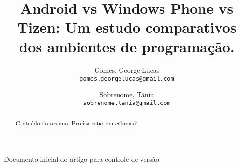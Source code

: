 \documentclass[11pt,a4paper]{article}
\author{
	Gomes, George Lucas\\
	\texttt{gomes.georgelucas@gmail.com}
	\and
	Sobrenome, Tânia\\
	\texttt{sobrenome.tania@gmail.com}
}
\title{\Huge Android vs Windows Phone vs Tizen: Um estudo comparativos dos ambientes de programação.}
\begin{document}
\maketitle
	\begin{abstract}
		Conteúdo do resumo. Precisa estar em colunas?
	\end{abstract}

	\tableofcontents
Documento inicial do artigo para controle de versão.
\end{document}
